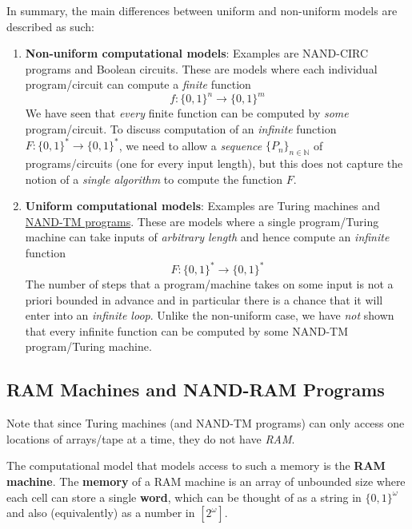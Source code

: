   In summary, the main differences between uniform and non-uniform models are described as such: 
  \begin{enumerate}
      \item \textbf{Non-uniform computational models}: Examples are NAND-CIRC programs and Boolean circuits. These are models where each individual program/circuit can compute a \textit{finite} function 
      \begin{equation}
        f: \{0,1\}^n \to \{0,1\}^m
      \end{equation}
      We have seen that \textit{every} finite function can be computed by \textit{some} program/circuit. To discuss computation of an \textit{infinite} function $F: \{0,1\}^* \to \{0,1\}^*$, we need to allow a \textit{sequence} $\big\{ P_n \big\}_{n \in \mathbb{N}}$ of programs/circuits (one for every input length), but this does not capture the notion of a \textit{single algorithm} to compute the function $F$. 
      \item \textbf{Uniform computational models}: Examples are Turing machines and \hyperref[def:nand-tm-programs]{NAND-TM programs}. These are models where a single program/Turing machine can take inputs of \textit{arbitrary length} and hence compute an \textit{infinite} function 
      \begin{equation}
        F: \{0,1\}^* \to \{0,1\}^*
      \end{equation}
      The number of steps that a program/machine takes on some input is not a priori bounded in advance and in particular there is a chance that it will enter into an \textit{infinite loop}. Unlike the non-uniform case, we have \textit{not} shown that every infinite function can be computed by some NAND-TM program/Turing machine. 
  \end{enumerate}

  \subsection{RAM Machines and NAND-RAM Programs}
  Note that since Turing machines (and NAND-TM programs) can only access one locations of arrays/tape at a time, they do not have \textit{RAM}.

  \begin{definition}
    \label{def:ram-machine}
  The computational model that models access to such a memory is the \textbf{RAM machine}. The \textbf{memory} of a RAM machine is an array of unbounded size where each cell can store a single \textbf{word}, which can be thought of as a string in $\{0,1\}^\omega$ and also (equivalently) as a number in $[2^\omega]$. 
  \end{definition}

